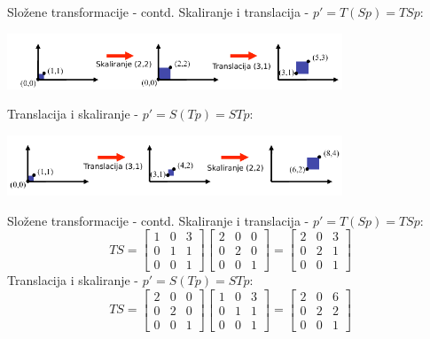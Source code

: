 \documentclass[9pt]{beamer}
\begin{document}
\begin{frame}{Složene transformacije - contd.}
	Skaliranje i translacija - $p' = T(Sp) = TS p$:
	\begin{center}
		\includegraphics[width=10cm]{slike/slozene_transformacije_01.png}
	\end{center}
	Translacija i skaliranje - $p' = S(Tp) = ST p$:
	\begin{center}
		\includegraphics[width=10cm]{slike/slozene_transformacije_02.png}
	\end{center}
\end{frame}

\begin{frame}{Složene transformacije - contd.}
	Skaliranje i translacija - $p' = T(Sp) = TS p$:
	$$ TS = \left[ \begin{array}{ccc}
	1 & 0 & 3 \\
	0 & 1 & 1  \\
	0 & 0 & 1 
	\end{array} \right]
	\left[ \begin{array}{ccc}
	2 & 0 & 0 \\
	0 & 2 & 0  \\
	0 & 0 & 1 
	\end{array} \right] = 
	\left[ \begin{array}{ccc}
	2 & 0 & 3 \\
	0 & 2 & 1  \\
	0 & 0 & 1 
	\end{array} \right]
	$$
	Translacija i skaliranje - $p' = S(Tp) = ST p$:
	$$ TS = \left[ \begin{array}{ccc}
	2 & 0 & 0 \\
	0 & 2 & 0  \\
	0 & 0 & 1 
	\end{array} \right]
	\left[ \begin{array}{ccc}
	1 & 0 & 3 \\
	0 & 1 & 1  \\
	0 & 0 & 1 
	\end{array} \right] = 
	\left[ \begin{array}{ccc}
	2 & 0 & 6 \\
	0 & 2 &2  \\
	0 & 0 & 1 
	\end{array} \right]
	$$
\end{frame}
\end{document}
